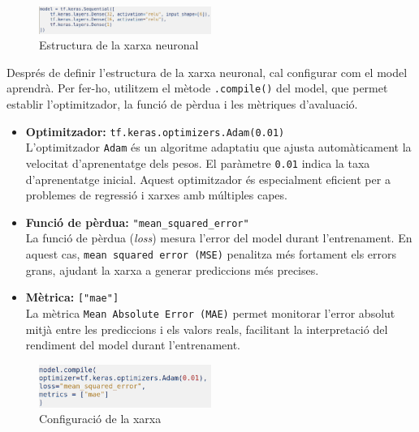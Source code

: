 \begin{figure}[H]
    \centering
    \includegraphics[width=0.5\textwidth]{./figures/26.png}
    \caption{Estructura de la xarxa neuronal}
\end{figure}

Després de definir l’estructura de la xarxa neuronal, cal configurar com el model aprendrà. Per fer-ho, utilitzem el mètode \texttt{.compile()} del model, que permet establir l’optimitzador, la funció de pèrdua i les mètriques d’avaluació.

\begin{itemize}
    \item \textbf{Optimitzador:} \texttt{tf.keras.optimizers.Adam(0.01)} \\
    L’optimitzador \texttt{Adam} és un algoritme adaptatiu que ajusta automàticament la velocitat d’aprenentatge dels pesos. El paràmetre \texttt{0.01} indica la taxa d’aprenentatge inicial. Aquest optimitzador és especialment eficient per a problemes de regressió i xarxes amb múltiples capes.

    \item \textbf{Funció de pèrdua:} \texttt{"mean\_squared\_error"} \\
    La funció de pèrdua (\textit{loss}) mesura l’error del model durant l’entrenament. En aquest cas, \texttt{mean squared error (MSE)} penalitza més fortament els errors grans, ajudant la xarxa a generar prediccions més precises.

    \item \textbf{Mètrica:} \texttt{["mae"]} \\
    La mètrica \texttt{Mean Absolute Error (MAE)} permet monitorar l’error absolut mitjà entre les prediccions i els valors reals, facilitant la interpretació del rendiment del model durant l’entrenament.
\end{itemize}

\begin{figure}[H]
    \centering
    \includegraphics[width=0.5\textwidth]{./figures/27.png}
    \caption{Configuració de la xarxa}
\end{figure}


